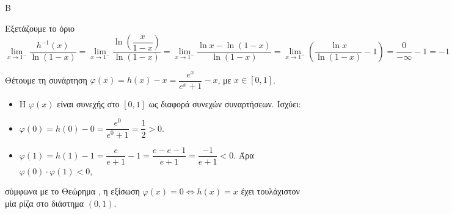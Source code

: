 \begin{thema}{Β}
\begin{erwthma}
\item Εξετάζουμε το όριο \[\displaystyle\lim\limits_{x \to 1^-} \dfrac{h^{-1}(x)}{\ln(1-x)} = \lim\limits_{x \to 1^-} \dfrac{\ln\left(\dfrac{x}{1-x}\right)}{\ln(1-x)} = \lim\limits_{x \to 1^-} \dfrac{\ln x - \ln(1-x)}{\ln(1-x)} = \lim\limits_{x \to 1^-} \left( \dfrac{\ln x}{\ln(1-x)} - 1 \right)=\frac{0}{-\infty}-1=-1\]
\item Θέτουμε τη συνάρτηση $\varphi(x) = h(x) - x = \dfrac{e^x}{e^x+1} - x$, με $x \in [0, 1]$.
\begin{itemize}
\item Η $\varphi(x)$ είναι συνεχής στο $[0, 1]$ ως διαφορά συνεχών συναρτήσεων.
Ισχύει:
\item $\varphi(0) = h(0) - 0 = \dfrac{e^0}{e^0+1} = \dfrac{1}{2} > 0$.
\item $\varphi(1) = h(1) - 1 = \dfrac{e}{e+1} - 1 = \dfrac{e - e - 1}{e+1} = \dfrac{-1}{e+1} < 0$. Άρα $\varphi(0) \cdot \varphi(1) < 0$,
\end{itemize}
 σύμφωνα με το Θεώρημα , η εξίσωση $\varphi(x) = 0 \Leftrightarrow h(x) = x$ έχει τουλάχιστον μία ρίζα στο διάστημα $(0, 1)$.
\end{erwthma}
\end{thema}

